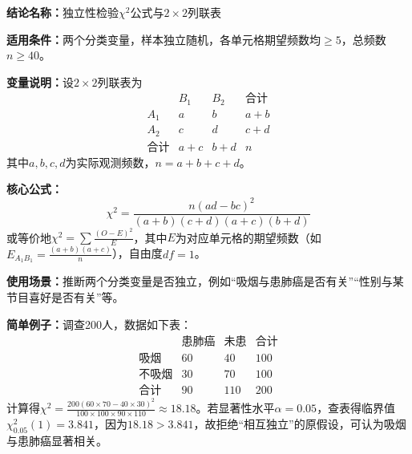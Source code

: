 \textbf{结论名称：}独立性检验$\chi^2$公式与$2\times2$列联表

\textbf{适用条件：}两个分类变量，样本独立随机，各单元格期望频数均$\ge 5$，总频数$n\ge 40$。

\textbf{变量说明：}设$2\times2$列联表为
\[
\begin{array}{c|cc|c}
 & B_1 & B_2 & \text{合计} \\ \hline
A_1 & a & b & a+b \\
A_2 & c & d & c+d \\ \hline
\text{合计} & a+c & b+d & n
\end{array}
\]
其中$a,b,c,d$为实际观测频数，$n=a+b+c+d$。

\textbf{核心公式：}
\[
\boxed{\chi^2 = \frac{n(ad-bc)^2}{(a+b)(c+d)(a+c)(b+d)}}
\]
或等价地$\displaystyle\chi^2 = \sum \frac{(O-E)^2}{E}$，其中$E$为对应单元格的期望频数（如$E_{A_1B_1}=\frac{(a+b)(a+c)}{n}$），自由度$df=1$。

\textbf{使用场景：}推断两个分类变量是否独立，例如“吸烟与患肺癌是否有关”“性别与某节目喜好是否有关”等。

\textbf{简单例子：}调查200人，数据如下表：
\[
\begin{array}{c|cc|c}
 & \text{患肺癌} & \text{未患} & \text{合计} \\ \hline
\text{吸烟} & 60 & 40 & 100 \\
\text{不吸烟} & 30 & 70 & 100 \\ \hline
\text{合计} & 90 & 110 & 200
\end{array}
\]
计算得$\chi^2 = \frac{200(60\times70-40\times30)^2}{100\times100\times90\times110} \approx 18.18$。若显著性水平$\alpha=0.05$，查表得临界值$\chi^2_{0.05}(1)=3.841$，因为$18.18>3.841$，故拒绝“相互独立”的原假设，可认为吸烟与患肺癌显著相关。